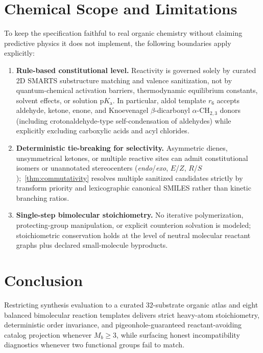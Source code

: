 \documentclass[11pt,a4paper]{article}
\theoremstyle{plain}
\theoremstyle{definition}
\theoremstyle{remark}
\newcommand{\chem}[1]{\ensuremath{\mathrm{#1}}}
\begin{document}
\section{Chemical Scope and Limitations}\label{sec:limitations}

To keep the specification faithful to real organic chemistry without claiming predictive physics it
does not implement, the following boundaries apply explicitly:

\begin{enumerate}
  \item \textbf{Rule-based constitutional level.} Reactivity is governed solely by curated 2D
    SMARTS substructure matching and valence sanitization, not by quantum-chemical activation
    barriers, thermodynamic equilibrium constants, solvent effects, or solution \(\mathrm{p}K_{\mathrm{a}}\).
    In particular, aldol template \( r_6 \) accepts aldehyde, ketone, enone, and Knoevenagel
    \( \beta \)-dicarbonyl \( \alpha \)-\chem{CH_{2,3}} donors (including crotonaldehyde-type
    self-condensation of aldehydes) while explicitly excluding carboxylic acids and acyl chlorides.
  \item \textbf{Deterministic tie-breaking for selectivity.} Asymmetric dienes, unsymmetrical
    ketones, or multiple reactive sites can admit constitutional isomers or unannotated stereocenters
    (\emph{endo}/\emph{exo}, \(E\)/\(Z\), \(R\)/\(S\));~\cref{thm:commutativity} resolves multiple
    sanitized candidates strictly by transform priority and lexicographic canonical SMILES rather
    than kinetic branching ratios.
  \item \textbf{Single-step bimolecular stoichiometry.} No iterative polymerization, protecting-group
    manipulation, or explicit counterion solvation is modeled; stoichiometric conservation holds at
    the level of neutral molecular reactant graphs plus declared small-molecule byproducts.
\end{enumerate}

\section{Conclusion}\label{sec:conclusion}

Restricting synthesis evaluation to a curated \( 32 \)-substrate organic atlas and eight balanced
bimolecular reaction templates delivers strict heavy-atom stoichiometry, deterministic order
invariance, and pigeonhole-guaranteed reactant-avoiding catalog projection whenever
\( M_b \ge 3 \), while surfacing honest incompatibility diagnostics whenever two functional
groups fail to match.
\end{document}
